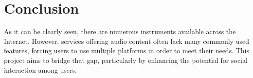 \section*{Conclusion}
As it can be clearly seen, there are numerous instruments available across the Internet.
However, services offering audio content often lack many commonly used features,
forcing users to use multiple platforms in order to meet their needs. This project aims to bridge that gap,
particularly by enhancing the potential for social interaction among users.


